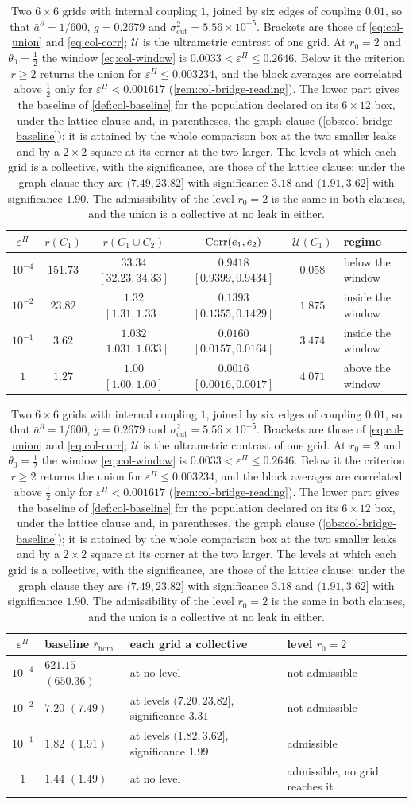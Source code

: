 \begin{table}[t]
\centering
\caption{Two $6\times6$ grids with internal coupling $1$, joined by six edges of coupling $0.01$, so that $\bar a^\partial=1/600$, $g=0.2679$ and $\sigma^2_{\mathrm{cut}}=5.56\times10^{-5}$. Brackets are those of \eqref{eq:col-union} and \eqref{eq:col-corr}; $\mathcal U$ is the ultrametric contrast of one grid. At $r_0=2$ and $\theta_0=\frac12$ the window \eqref{eq:col-window} is $0.0033<\varepsilon^\Pi\le0.2646$. Below it the criterion $r\ge2$ returns the union for $\varepsilon^\Pi\le0.003234$, and the block averages are correlated above $\frac12$ only for $\varepsilon^\Pi<0.001617$ (\cref{rem:col-bridge-reading}). The lower part gives the baseline of \cref{def:col-baseline} for the population declared on its $6\times12$ box, under the lattice clause and, in parentheses, the graph clause (\cref{obs:col-bridge-baseline}); it is attained by the whole comparison box at the two smaller leaks and by a $2\times2$ square at its corner at the two larger. The levels at which each grid is a collective, with the significance, are those of the lattice clause; under the graph clause they are $(7.49,23.82]$ with significance $3.18$ and $(1.91,3.62]$ with significance $1.90$. The admissibility of the level $r_0=2$ is the same in both clauses, and the union is a collective at no leak in either.}
\label{tab:col-bridge}
\begin{tabular}{@{}cccccl@{}}
\toprule
$\varepsilon^\Pi$ & $r(C_1)$ & $r(C_1\cup C_2)$ & $\operatorname{Corr}(\bar e_1,\bar e_2)$ & $\mathcal U(C_1)$ & regime\\
\midrule
$10^{-4}$ & $151.73$ & $33.34$ $[32.23,34.33]$ & $0.9418$ $[0.9399,0.9434]$ & $0.058$ & below the window\\
$10^{-2}$ & $23.82$ & $1.32$ $[1.31,1.33]$ & $0.1393$ $[0.1355,0.1429]$ & $1.875$ & inside the window\\
$10^{-1}$ & $3.62$ & $1.032$ $[1.031,1.033]$ & $0.0160$ $[0.0157,0.0164]$ & $3.474$ & inside the window\\
$1$ & $1.27$ & $1.00$ $[1.00,1.00]$ & $0.0016$ $[0.0016,0.0017]$ & $4.071$ & above the window\\
\bottomrule
\end{tabular}

\medskip
\begin{tabular}{@{}clll@{}}
\toprule
$\varepsilon^\Pi$ & baseline $\bar r_{\mathrm{hom}}$ & each grid a collective & level $r_0=2$\\
\midrule
$10^{-4}$ & $621.15$ $(650.36)$ & at no level & not admissible\\
$10^{-2}$ & $7.20$ $(7.49)$ & at levels $(7.20,23.82]$, significance $3.31$ & not admissible\\
$10^{-1}$ & $1.82$ $(1.91)$ & at levels $(1.82,3.62]$, significance $1.99$ & admissible\\
$1$ & $1.44$ $(1.49)$ & at no level & admissible, no grid reaches it\\
\bottomrule
\end{tabular}
\end{table}

